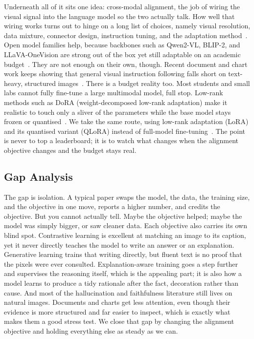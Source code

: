 \documentclass[preprint,12pt]{elsarticle}
\begin{document}
Underneath all of it sits one idea: cross-modal alignment, the job of wiring the visual signal into the language model so the two actually talk.
How well that wiring works turns out to hinge on a long list of choices, namely visual resolution, data mixture, connector design, instruction tuning, and the adaptation method~\cite{laurencon2024whatmatters,zhang2025mm15,deitke2025molmo}.
Open model families help, because backbones such as Qwen2-VL, BLIP-2, and LLaVA-OneVision are strong out of the box yet still adaptable on an academic budget~\cite{wang2024qwen2vl,li2023blip2,li2025llavaonevision}.
They are not enough on their own, though.
Recent document and chart work keeps showing that general visual instruction following falls short on text-heavy, structured images~\cite{fu2025textrichsurvey,wang2024docllm,masry2024chartinstruct,masry2025chartgemma}.
There is a budget reality too.
Most students and small labs cannot fully fine-tune a large multimodal model, full stop.
Low-rank methods such as DoRA (weight-decomposed low-rank adaptation) make it realistic to touch only a sliver of the parameters while the base model stays frozen or quantised~\cite{liu2024dora}.
We take the same route, using low-rank adaptation (LoRA) and its quantised variant (QLoRA) instead of full-model fine-tuning~\cite{hu2022lora,dettmers2023qlora}.
The point is never to top a leaderboard; it is to watch what changes when the alignment objective changes and the budget stays real.

\subsection{Gap Analysis}
The gap is isolation.
A typical paper swaps the model, the data, the training size, and the objective in one move, reports a higher number, and credits the objective.
But you cannot actually tell.
Maybe the objective helped; maybe the model was simply bigger, or saw cleaner data.
Each objective also carries its own blind spot.
Contrastive learning is excellent at matching an image to its caption, yet it never directly teaches the model to write an answer or an explanation.
Generative learning trains that writing directly, but fluent text is no proof that the pixels were ever consulted.
Explanation-aware training goes a step further and supervises the reasoning itself, which is the appealing part; it is also how a model learns to produce a tidy rationale after the fact, decoration rather than cause.
And most of the hallucination and faithfulness literature still lives on natural images.
Documents and charts get less attention, even though their evidence is more structured and far easier to inspect, which is exactly what makes them a good stress test.
We close that gap by changing the alignment objective and holding everything else as steady as we can.
\end{document}
